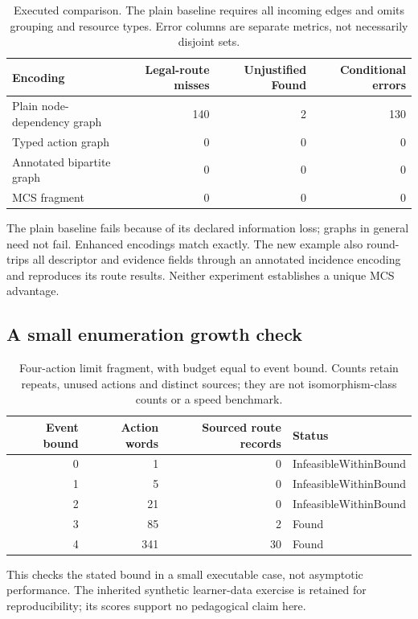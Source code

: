 \documentclass[11pt,a4paper]{article}
\theoremstyle{remark}
\begin{document}
\begin{table}[t]
\centering\small
\begin{tabular}{@{}lrrr@{}}
\toprule Encoding & Legal-route misses & Unjustified Found & Conditional errors\\\midrule
Plain node-dependency graph & 140 & 2 & 130\\
Typed action graph & 0 & 0 & 0\\
Annotated bipartite graph & 0 & 0 & 0\\
MCS fragment & 0 & 0 & 0\\
\bottomrule
\end{tabular}
\caption{Executed comparison. The plain baseline requires all incoming edges
and omits grouping and resource types. Error columns are separate metrics,
not necessarily disjoint sets.}
\label{tab:comparison}
\end{table}
The plain baseline fails because of its declared information loss; graphs
in general need not fail. Enhanced encodings match exactly.
The new example also round-trips all descriptor and evidence fields through
an annotated incidence encoding and reproduces its route results.
Neither experiment establishes a unique MCS advantage.

\subsection{A small enumeration growth check}
\begin{table}[htbp]
\centering\small
\begin{tabular}{@{}rrrl@{}}
\toprule Event bound & Action words & Sourced route records & Status\\\midrule
0 & 1 & 0 & InfeasibleWithinBound\\
1 & 5 & 0 & InfeasibleWithinBound\\
2 & 21 & 0 & InfeasibleWithinBound\\
3 & 85 & 2 & Found\\
4 & 341 & 30 & Found\\
\bottomrule
\end{tabular}
\caption{Four-action limit fragment, with budget equal to event bound.
Counts retain repeats, unused actions and distinct sources; they are not
isomorphism-class counts or a speed benchmark.}
\label{tab:scale}
\end{table}
This checks the stated bound in a small executable case, not asymptotic
performance. The inherited synthetic learner-data exercise is retained for
reproducibility; its scores support no pedagogical claim here.
\end{document}
